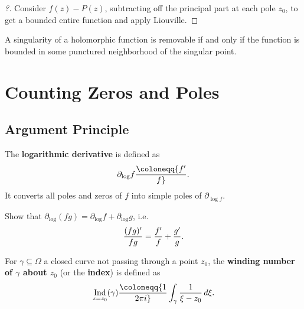 \begin{proof}[?]

Consider \(f(z) - P(z)\), subtracting off the principal part at each
pole \(z_0\), to get a bounded entire function and apply Liouville.

\end{proof}

\begin{theorem}

A singularity of a holomorphic function is removable if and only if the
function is bounded in some punctured neighborhood of the singular
point.

\end{theorem}

\hypertarget{counting-zeros-and-poles}{%
\section{Counting Zeros and Poles}\label{counting-zeros-and-poles}}

\hypertarget{argument-principle}{%
\subsection{Argument Principle}\label{argument-principle}}

\begin{definition}

The \textbf{logarithmic derivative} is defined as
\begin{align*}
{\partial}_{\log} f \coloneqq{f' \over f}
.\end{align*}
It converts all poles and zeros of \(f\) into simple poles of
\({\partial}_{\log f}\).

\end{definition}

\begin{exercise}[?]

Show that
\({\partial}_{\log}(fg) = {\partial}_{\log} f + {\partial}_{\log} g\),
i.e.~
\begin{align*}
{ (fg)' \over fg} = {f'\over f} + {g' \over g}
.\end{align*}

\end{exercise}

\begin{definition}

For \(\gamma \subseteq \Omega\) a closed curve not passing through a
point \(z_0\), the \textbf{winding number of \(\gamma\) about \(z_0\)}
(or the \textbf{index}) is defined as
\begin{align*}
\mathop{\mathrm{Ind}}_{z=z_0}(\gamma) \coloneqq{1\over 2\pi i} \int_\gamma {1\over \xi -z_0}\,d\xi
.\end{align*}

\end{definition}

